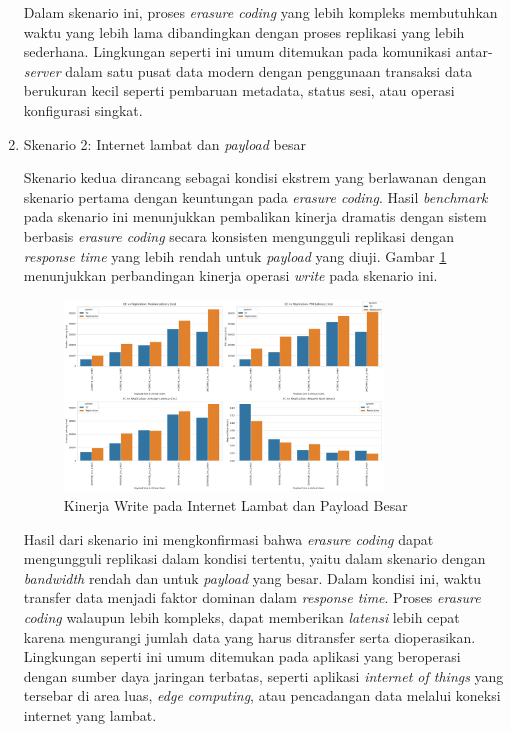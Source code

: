 \begin{enumerate}
  Dalam skenario ini, proses \textit{erasure coding} yang lebih kompleks membutuhkan waktu yang lebih lama dibandingkan dengan proses replikasi yang lebih sederhana. Lingkungan seperti ini umum ditemukan pada komunikasi antar-\textit{server} dalam satu pusat data modern dengan penggunaan transaksi data berukuran kecil seperti pembaruan metadata, status sesi, atau operasi konfigurasi singkat.
  
  \item Skenario 2: Internet lambat dan \textit{payload} besar
  
  Skenario kedua dirancang sebagai kondisi ekstrem yang berlawanan dengan skenario pertama dengan keuntungan pada \textit{erasure coding}. Hasil \textit{benchmark} pada skenario ini menunjukkan pembalikan kinerja dramatis dengan sistem berbasis \textit{erasure coding} secara konsisten mengungguli replikasi dengan \textit{response time} yang lebih rendah untuk \textit{payload} yang diuji. Gambar \ref{fig:write-bigload-slownet} menunjukkan perbandingan kinerja operasi \textit{write} pada skenario ini.

  \begin{figure}[ht]
      \centering
      \includegraphics[width=0.8\textwidth]{resources/chapter-4/write_bigload_slownet.png}

      \caption{Kinerja Write pada Internet Lambat dan Payload Besar}
      \label{fig:write-bigload-slownet}
  \end{figure}

  Hasil dari skenario ini mengkonfirmasi bahwa \textit{erasure coding} dapat mengungguli replikasi dalam kondisi tertentu, yaitu dalam skenario dengan \textit{bandwidth} rendah dan untuk \textit{payload} yang besar. Dalam kondisi ini, waktu transfer data menjadi faktor dominan dalam \textit{response time}. Proses \textit{erasure coding} walaupun lebih kompleks, dapat memberikan \textit{latensi} lebih cepat karena mengurangi jumlah data yang harus ditransfer serta dioperasikan. Lingkungan seperti ini umum ditemukan pada aplikasi yang beroperasi dengan sumber daya jaringan terbatas, seperti aplikasi \textit{internet of things} yang tersebar di area luas, \textit{edge computing}, atau pencadangan data melalui koneksi internet yang lambat. 


\end{enumerate}
